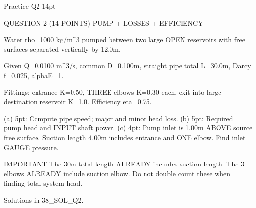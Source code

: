 Practice Q2 14pt

QUESTION 2 (14 POINTS)
PUMP + LOSSES + EFFICIENCY

Water rho=1000 kg/m^3 pumped between two large OPEN reservoirs with free surfaces separated vertically by 12.0m.

Given Q=0.0100 m^3/s, common D=0.100m, straight pipe total L=30.0m, Darcy f=0.025, alphaE=1.

Fittings: entrance K=0.50, THREE elbows K=0.30 each, exit into large destination reservoir K=1.0.
Efficiency eta=0.75.

(a) 5pt: Compute pipe speed; major and minor head loss.
(b) 5pt: Required pump head and INPUT shaft power.
(c) 4pt: Pump inlet is 1.00m ABOVE source free surface. Suction length 4.00m includes entrance and ONE elbow. Find inlet GAUGE pressure.

IMPORTANT
The 30m total length ALREADY includes suction length. The 3 elbows ALREADY include suction elbow. Do not double count these when finding total-system head.

Solutions in 38_SOL_Q2.
